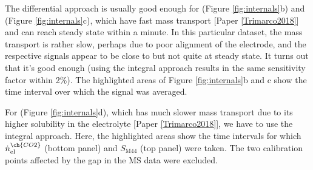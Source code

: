 The differential approach is usually good enough for  (Figure \ref{fig:internals}b) and  (Figure \ref{fig:internals}c), which have fast mass transport [Paper \ref{Trimarco2018}] and can reach steady state within a minute. In this particular dataset, the mass transport is rather slow, perhaps due to poor alignment of the electrode, and the respective signals appear to be close to but not quite at steady state. It turns out that it's good enough (using the integral approach results in the same sensitivity factor within 2\%). The highlighted areas of Figure \ref{fig:internals}b and c show the time interval over which the signal was averaged.

For  (Figure \ref{fig:internals}d), which has much slower mass transport due to its higher solubility in the electrolyte [Paper \ref{Trimarco2018}], we have to use the integral approach. Here, the highlighted areas show the time intervals for which $\dot{n}^{\ch{CO2}}_\text{el}$ (bottom panel) and $S_\text{M44}$ (top panel) were taken. The two calibration points affected by the gap in the MS data were excluded.

